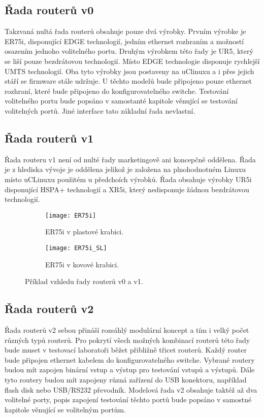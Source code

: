 \subsection{Řada routerů v0}
Takzvaná nultá řada routerů obsahuje pouze dvá výrobky. Prvním výrobke je ER75i, disponující EDGE technologií, jedním ethernet rozhraním a možností osazením jednoho volitelného portu. Druhým výrobkem této řady je UR5, který se liší pouze bezdrátovou technologií. Místo EDGE technologie disponuje rychlejší UMTS technologií. Oba tyto výrobky jsou postaveny na uClinuxu a i přes jejich stáří se firmware stále udržuje. U těchto modelů bude připojeno pouze ethernet rozhraní, které bude připojeno do konfigurovatelného switche. Testování volitelného portu bude popsáno v samostanté kapitole věnující se testování volitelných portů. Jiné interface tato základní řada nevlastní.

\subsection{Řada routerů v1}
Řada routeru v1 není od nulté řady marketingově ani koncepčně oddělena. Řada je z hlediska vývoje je oddělena jelikož je založena na plnohodnotném Linuxu místo uCLinuxu použitém u předchoích výrobků. Řada obsahuje výrobky UR5i disponující HSPA+ technologií a XR5i, který nedisponuje žádnou bezdrátovou technologií.

\begin{figure}[h]
  \begin{subfigure}[h]{0.5\LW}
    \centering
    \texttt{[image: ER75i]}
    \caption{ER75i v plastové krabici.}
    \label{fig:ER75i}
  \end{subfigure}
  \begin{subfigure}[h]{0.5\LW}
    \centering
    \texttt{[image: ER75i\_SL]}
    \caption{ER75i v kovové krabici.}
    \label{fig:ER75i SL}
  \end{subfigure}
  \caption{Příklad vzhledu řady routerů v0 a v1.}
  \label{fig:ER75i}
\end{figure}

\subsection{Řada routerů v2}
Řada routerů v2 sebou přináší rozsáhlý modulární koncept a tím i velký počet různých typů routerů. Pro pokrytí všech možných kombinací routerů této řady bude muset v testovací laboratoři běžet přibližně třicet routerů. Každý router bude připojen ethernet kabelem do konfigurovatelného switche. Vybrané routery budou mít zapojen binární vstup a výstup pro testování vstupů a výstupů. Dále tyto routery budou mít zapojeny různá zařízení do USB konektoru, například flash disk nebo USB/RS232 převodník. Modelová řada v2 obsahuje taktéž až dva volitelné porty, popis zapojení testování těchto portů bude popsáno v samostné kapitole věnující se volitelným portům.

